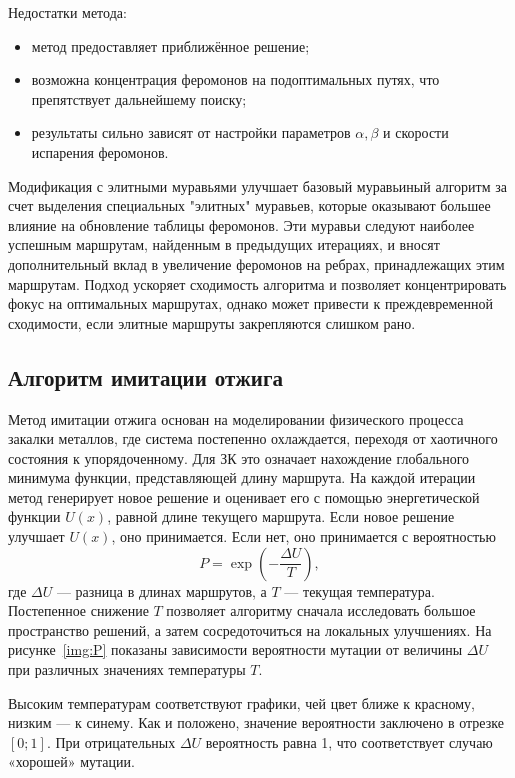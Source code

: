 Недостатки метода:
\begin{itemize}[label=---]
    \item метод предоставляет приближённое решение;
    \item возможна концентрация феромонов на подоптимальных путях, что препятствует дальнейшему поиску;
    \item результаты сильно зависят от настройки параметров $\alpha, \beta$ и скорости испарения феромонов.
\end{itemize}
Модификация с элитными муравьями улучшает базовый муравьиный алгоритм за счет выделения специальных "элитных" муравьев, которые оказывают большее влияние на обновление таблицы феромонов. Эти муравьи следуют наиболее успешным маршрутам, найденным в предыдущих итерациях, и вносят дополнительный вклад в увеличение феромонов на ребрах, принадлежащих этим маршрутам. Подход ускоряет сходимость алгоритма и позволяет концентрировать фокус на оптимальных маршрутах, однако может привести к преждевременной сходимости, если элитные маршруты закрепляются слишком рано.

\subsection{Алгоритм имитации отжига}
Метод имитации отжига основан на моделировании физического процесса закалки металлов, где система постепенно охлаждается, переходя от хаотичного состояния к упорядоченному. Для ЗК это означает нахождение глобального минимума функции, представляющей длину маршрута. На каждой итерации метод генерирует новое решение и оценивает его с помощью энергетической функции \(U(x)\), равной длине текущего маршрута. Если новое решение улучшает \(U(x)\), оно принимается. Если нет, оно принимается с вероятностью 
\begin{equation}
P = \exp\left(-\frac{\Delta U}{T}\right),
\end{equation}
где \(\Delta U\) — разница в длинах маршрутов, а \(T\) — текущая температура. Постепенное снижение \(T\) позволяет алгоритму сначала исследовать большое пространство решений, а затем сосредоточиться на локальных улучшениях.
На рисунке~\ref{img:P} показаны зависимости вероятности мутации от величины \(\Delta U\) при различных значениях температуры $T$.

Высоким температурам соответствуют графики, чей цвет ближе к красному, низким --- к синему. Как и положено, значение вероятности заключено в отрезке $[0;1]$. При отрицательных \(\Delta U\) вероятность равна 1, что соответствует случаю «хорошей» мутации.

